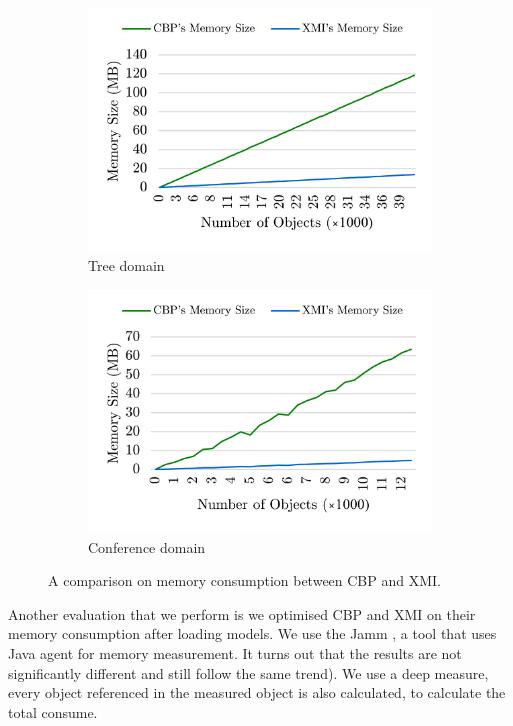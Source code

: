 \documentclass{llncs}
\begin{document}
\begin{figure}	
	\begin{subfigure}[t]{0.5\linewidth}
		\includegraphics[width=\linewidth]{memory_use_tree}
		\caption{Tree domain}\label{fig:append_speed_tree}		
	\end{subfigure}
	\hfill
	\begin{subfigure}[t]{0.5\linewidth}
		\includegraphics[width=\linewidth]{memory_use_conf}
		\caption{Conference domain}\label{fig:append_speed_conference}
	\end{subfigure}
	\caption{A comparison on memory consumption between CBP and XMI.}
	\label{fig:memory_use}
\end{figure}

Another evaluation that we perform is we optimised CBP and XMI on their memory consumption after loading models. We use the Jamm \cite{brosius2017jamm}, a tool that uses Java agent for memory measurement. It turns out that the results are not significantly different and still follow the same trend). We use a deep measure, every object referenced in the measured object is also calculated, to calculate the total consume. 
\end{document}

